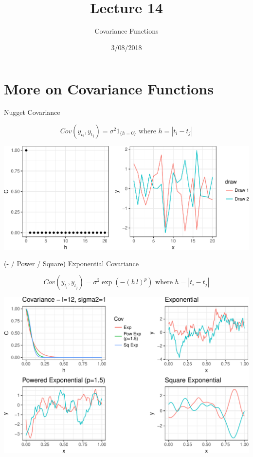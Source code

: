 \documentclass[11pt,ignorenonframetext,]{beamer}
\title{Lecture 14}
\subtitle{Covariance Functions}
\date{3/08/2018}
\begin{document}
\frame{\titlepage}

\hypertarget{more-on-covariance-functions}{%
\section{More on Covariance
Functions}\label{more-on-covariance-functions}}

\begin{frame}[t]{%
\protect\hypertarget{nugget-covariance}{%
Nugget Covariance}}

\vspace{-5mm}

\[ Cov(y_{t_i}, y_{t_j}) = \sigma^2 {1}_{\{h=0\}} \text{   where } h = |t_i - t_j|\]

\vspace{5mm}

\begin{center}\includegraphics[width=\textwidth]{Lec14_files/figure-beamer/unnamed-chunk-1-1} \end{center}

\end{frame}

\begin{frame}[t]{%
\protect\hypertarget{power-square-exponential-covariance}{%
(- / Power / Square) Exponential Covariance}}

\vspace{-5mm}

\[ Cov(y_{t_i}, y_{t_j}) = \sigma^2\exp\left(-(h\,l)^p\right) \text{   where } h = |t_i - t_j|\]

\begin{center}\includegraphics[width=\textwidth]{Lec14_files/figure-beamer/unnamed-chunk-2-1} \end{center}

\end{frame}
\end{document}
